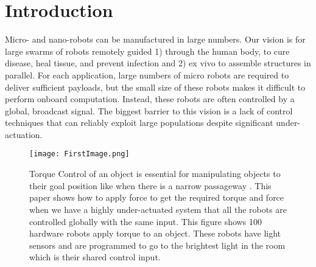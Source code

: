\section{Introduction}\label{sec:Intro}
Micro- and nano-robots can be manufactured in large numbers.
Our vision is for large swarms of robots remotely guided 1) through the human body, to cure disease, heal tissue, and prevent infection and 2) ex vivo to assemble structures in parallel. 
 For each application, large numbers of micro robots are required  to deliver sufficient payloads, but the small size of these robots makes it difficult to perform onboard computation.  Instead, these robots are often controlled by a global, broadcast signal. 
 The biggest barrier to this vision is a lack of control techniques that can reliably exploit large populations despite significant under-actuation.  
 

\begin{figure}
\begin{center}
	\texttt{[image: FirstImage.png]}
\end{center}
\vspace{-1em}
\caption{\label{fig:FirstImage}
Torque Control of an object is essential for manipulating objects to their goal position like when there is a narrow passageway . This paper shows how to apply force to get the required torque and force when we have a highly under-actuated system that all the robots are controlled globally with the same input. This figure shows 100 hardware robots apply torque to an object. These robots have light sensors and are programmed to go to the brightest light in the room which is their shared control input.
}
\vspace{-1em}
\end{figure}


